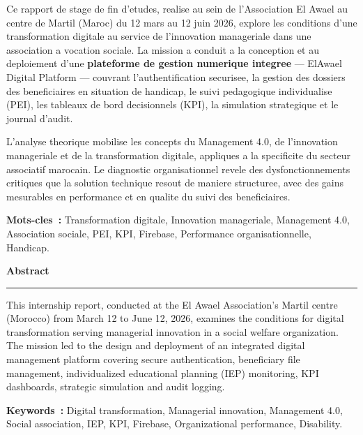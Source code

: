 \documentclass[12pt,a4paper,openany]{report}
\begin{document}
Ce rapport de stage de fin d'etudes, realise au sein de l'Association El
Awael au centre de Martil (Maroc) du 12 mars au 12 juin 2026, explore
les conditions d'une transformation digitale au service de l'innovation
manageriale dans une association a vocation sociale. La mission a conduit
a la conception et au deploiement d'une \textbf{plateforme de gestion numerique
integree} --- ElAwael Digital Platform --- couvrant l'authentification
securisee, la gestion des dossiers des beneficiaires en situation de
handicap, le suivi pedagogique individualise (PEI), les tableaux de bord
decisionnels (KPI), la simulation strategique et le journal d'audit.

\vspace{0.3cm}
L'analyse theorique mobilise les concepts du Management 4.0, de
l'innovation manageriale et de la transformation digitale, appliques a la
specificite du secteur associatif marocain. Le diagnostic organisationnel
revele des dysfonctionnements critiques que la solution technique resout
de maniere structuree, avec des gains mesurables en performance et en
qualite du suivi des beneficiaires.

\vspace{0.3cm}
\textbf{Mots-cles~:} Transformation digitale, Innovation manageriale,
Management 4.0, Association sociale, PEI, KPI, Firebase,
Performance organisationnelle, Handicap.

\vspace{0.8cm}
\begin{center}
{\large\bfseries\color{bleu} Abstract}\\[0.2cm]
\textcolor{bleu}{\rule{0.5\textwidth}{0.5pt}}
\end{center}
\vspace{0.4cm}

This internship report, conducted at the El Awael Association's Martil
centre (Morocco) from March 12 to June 12, 2026, examines the conditions
for digital transformation serving managerial innovation in a social
welfare organization. The mission led to the design and deployment of an
integrated digital management platform covering secure authentication,
beneficiary file management, individualized educational planning (IEP)
monitoring, KPI dashboards, strategic simulation and audit logging.

\vspace{0.3cm}
\textbf{Keywords~:} Digital transformation, Managerial innovation,
Management 4.0, Social association, IEP, KPI, Firebase,
Organizational performance, Disability.
\end{document}
